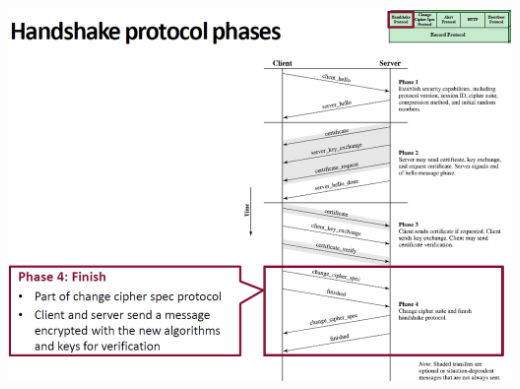 \documentclass[12pt]{article}
\begin{document}
 \includegraphics[width=\linewidth]{./slides/L7P2HSP4.png}
 
\end{document}
